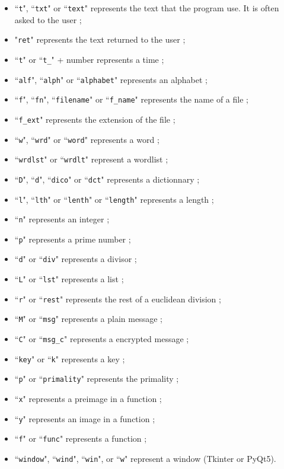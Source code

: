 \documentclass[a4paper,10pt]{report}
\begin{document}
   \begin{itemize}
   \item ``\texttt{t}", ``\texttt{txt}" or ``\texttt{text}" represents the text that the program use. It is often asked to the user ;
   \item "\texttt{ret}" represents the text returned to the user ;
   \item ``\texttt{t}" or ``\texttt{t\_}" + number represents a time ;
   \item ``\texttt{alf}", ``\texttt{alph}" or ``\texttt{alphabet}" represents an alphabet ;
   \item ``\texttt{f}", ``\texttt{fn}", ``\texttt{filename}" or ``\texttt{f\_name}" represents the name of a file ;
   \item ``\texttt{f\_ext}" represents the extension of the file ;
   \item ``\texttt{w}", ``\texttt{wrd}" or ``\texttt{word}" represents a word ;
   \item ``\texttt{wrdlst}" or ``\texttt{wrdlt}" represent a wordlist ;
   \item ``\texttt{D}", ``\texttt{d}", ``\texttt{dico}" or ``\texttt{dct}" represents a dictionnary ;
   \item ``\texttt{l}", ``\texttt{lth}" or ``\texttt{lenth}" or ``\texttt{length}" represents a length ;
   \item ``\texttt{n}" represents an integer ;
   \item ``\texttt{p}" represents a prime number ;
   \item ``\texttt{d}" or ``\texttt{div}" represents a divisor ;
   \item ``\texttt{L}" or ``\texttt{lst}" represents a list ;
   \item ``\texttt{r}" or ``\texttt{rest}" represents the rest of a euclidean division ;
   \item ``\texttt{M}" or ``\texttt{msg}" represents a plain message ;
   \item ``\texttt{C}" or ``\texttt{msg\_c}" represents a encrypted message ;
   \item ``\texttt{key}" or ``\texttt{k}" represents a key ;
   \item ``\texttt{p}" or ``\texttt{primality}" represents the primality ;
   \item ``\texttt{x}" represents a preimage in a function ;
   \item ``\texttt{y}" represents an image in a function ;
   \item ``\texttt{f}" or ``\texttt{func}" represents a function ;
   \item ``\texttt{window}", ``\texttt{wind}", ``\texttt{win}", or ``\texttt{w}" represent a window (Tkinter or PyQt5).
   
   \end{itemize}
\end{document}
